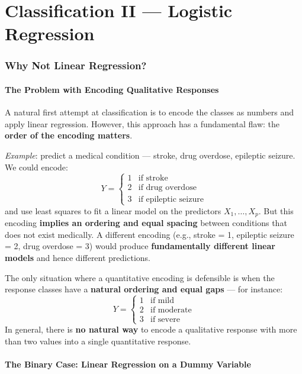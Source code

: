 \documentclass[11pt,a4paper]{article}
\theoremstyle{definition}
\theoremstyle{plain}
\theoremstyle{remark}
\begin{document}
\part{Classification II --- Logistic Regression}

\section{Why Not Linear Regression?}

\subsection{The Problem with Encoding Qualitative Responses}

A natural first attempt at classification is to encode the classes as numbers and apply linear regression. However, this approach has a fundamental flaw: the \textbf{order of the encoding matters}.

\textit{Example}: predict a medical condition — stroke, drug overdose, epileptic seizure. We could encode:
\[
    Y = \begin{cases} 1 & \text{if stroke} \\ 2 & \text{if drug overdose} \\ 3 & \text{if epileptic seizure} \end{cases}
\]
and use least squares to fit a linear model on the predictors $X_1, \ldots, X_p$. But this encoding \textbf{implies an ordering and equal spacing} between conditions that does not exist medically. A different encoding (e.g., stroke = 1, epileptic seizure = 2, drug overdose = 3) would produce \textbf{fundamentally different linear models} and hence different predictions.

The only situation where a quantitative encoding is defensible is when the response classes have a \textbf{natural ordering and equal gaps} — for instance:
\[
    Y = \begin{cases} 1 & \text{if mild} \\ 2 & \text{if moderate} \\ 3 & \text{if severe} \end{cases}
\]
In general, there is \textbf{no natural way} to encode a qualitative response with more than two values into a single quantitative response.

\subsection{The Binary Case: Linear Regression on a Dummy Variable}
\end{document}
